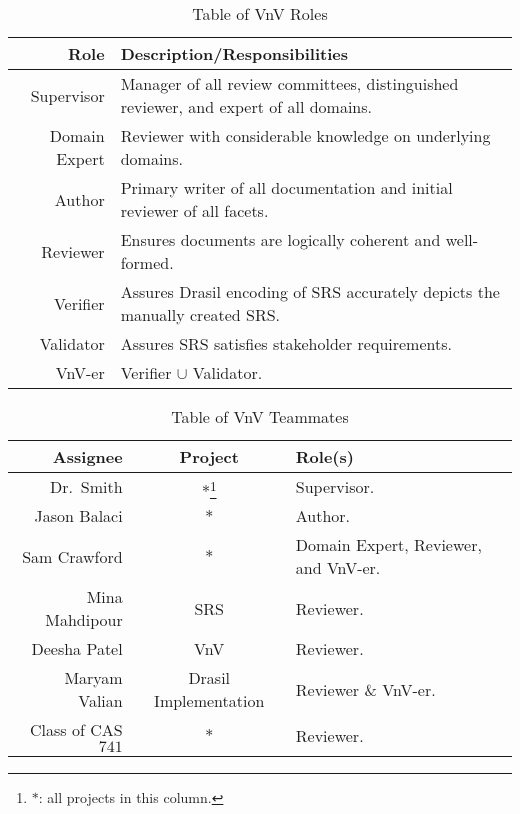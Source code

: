 \documentclass[12pt, titlepage]{article}
\begin{document}
\begin{longtable}{|r|p{8cm}|}
    \caption{Table of VnV Roles}
    \label{table:vnv_roles}

    \\ \hline
    \rowcolor{Maroon}
    \textbf{Role} & \textbf{Description/Responsibilities}                                                \\ \hline
    \rowcolor{White}
    Supervisor    & Manager of all review committees, distinguished reviewer, and expert of all domains. \\ \hline
    Domain Expert & Reviewer with considerable knowledge on underlying domains.                          \\ \hline
    Author        & Primary writer of all documentation and initial reviewer of all facets.              \\ \hline
    Reviewer      & Ensures documents are logically coherent and well-formed.                            \\ \hline
    Verifier      & Assures Drasil encoding of SRS accurately depicts the manually created SRS.          \\ \hline
    Validator     & Assures SRS satisfies stakeholder requirements.                                      \\ \hline
    VnV-er        & Verifier \(\cup\) Validator.                                                         \\ \hline
\end{longtable}

\begin{longtable}{|r|c|l|}
    \caption{Table of VnV Teammates}
    \label{table:vnv_teammates}

    \\ \hline
    \rowcolor{Maroon}
    \textbf{Assignee}    & \textbf{Project}                  & \textbf{Role(s)}                     \\ \hline
    \rowcolor{White}
    Dr.\ Smith           & \(*\)\footnote{\(*\): 
        all projects in this column.}                        & Supervisor.                          \\ \hline
    Jason Balaci         & \(*\)                             & Author.                              \\ \hline
    Sam Crawford         & \(*\)                             & Domain Expert, Reviewer, and VnV-er. \\ \hline
    Mina Mahdipour       & SRS                               & Reviewer.                            \\ \hline
    Deesha Patel         & VnV                               & Reviewer.                            \\ \hline
    Maryam Valian        & Drasil Implementation             & Reviewer \& VnV-er.                  \\ \hline
    Class of CAS \(741\) & \(*\)                             & Reviewer.                            \\ \hline
\end{longtable}
\end{document}
